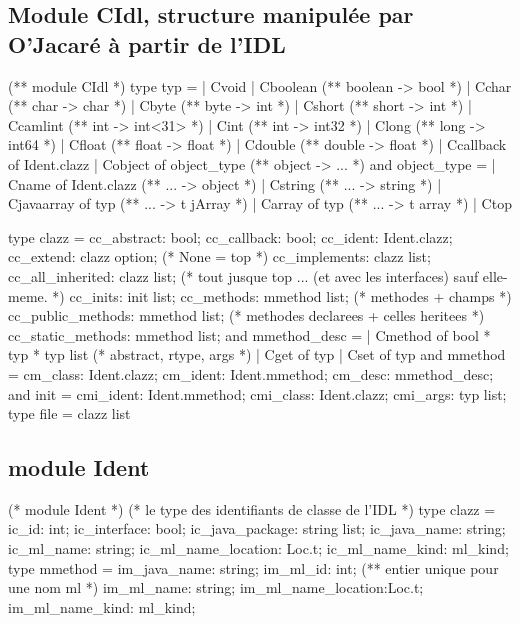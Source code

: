 \documentclass[a4paper, 11pt, notitlepage]{article}
\begin{document}
\subsection*{Module CIdl, structure manipulée par O'Jacaré à partir de
  l'IDL}
\begin{OCaml}
(**  module CIdl  *)
type typ =
  | Cvoid
  | Cboolean (** boolean -> bool *)
  | Cchar (** char -> char *)
  | Cbyte (** byte -> int *)
  | Cshort (** short -> int *)
  | Ccamlint (** int -> int<31> *)
  | Cint (** int -> int32 *)
  | Clong (** long -> int64 *)
  | Cfloat (** float -> float *)
  | Cdouble (** double -> float *)
  | Ccallback of Ident.clazz
  | Cobject of object_type (** object -> ... *)
and object_type = 
  | Cname of Ident.clazz (** ... -> object *)
  | Cstring (** ... -> string *)
  | Cjavaarray of typ (** ... -> t jArray *) 
  | Carray of typ (** ... -> t array *) 
  | Ctop

type clazz = {
    cc_abstract: bool;
    cc_callback: bool;
    cc_ident: Ident.clazz;
    cc_extend: clazz option; (* None = top *)
    cc_implements: clazz list;
    cc_all_inherited: clazz list; (* tout jusque top ... (et avec les interfaces) sauf elle-meme. *)
    cc_inits: init list;
    cc_methods: mmethod list; (* methodes + champs *)
    cc_public_methods: mmethod list; (* methodes declarees + celles heritees *)
    cc_static_methods: mmethod list; 
  }
and mmethod_desc = 
  | Cmethod of bool * typ * typ list (* abstract, rtype, args *)
  | Cget of typ
  | Cset of typ
and mmethod = {
    cm_class: Ident.clazz;
    cm_ident: Ident.mmethod; 
    cm_desc: mmethod_desc;
  }         
and init = {
    cmi_ident: Ident.mmethod;
    cmi_class: Ident.clazz;
    cmi_args: typ list;
  }
type file = clazz list
\end{OCaml}

\subsection*{module Ident}
\begin{OCaml}
(* module Ident  *)
(* le type des identifiants de classe de l'IDL *)
type clazz = {
    ic_id: int;
    ic_interface: bool;
    ic_java_package: string list;
    ic_java_name: string;
    ic_ml_name: string;
    ic_ml_name_location: Loc.t;
    ic_ml_name_kind: ml_kind;
  }
type mmethod = {
    im_java_name: string;
    im_ml_id: int; (** entier unique pour une nom ml *)
    im_ml_name: string;
    im_ml_name_location:Loc.t;
    im_ml_name_kind: ml_kind;
  }
\end{OCaml}
\ 
\end{document}
